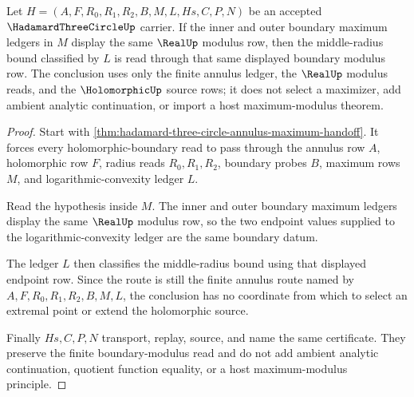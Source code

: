 \begin{theorem}
\label{thm:hadamard-three-circle-maximum-modulus-boundary}
Let $H=(A,F,R_0,R_1,R_2,B,M,L,Hs,C,P,N)$ be an accepted $\HadamardThreeCircleUp$ carrier. If the inner and outer boundary maximum ledgers in $M$ display the same $\RealUp$ modulus row, then the middle-radius bound classified by $L$ is read through that same displayed boundary modulus row. The conclusion uses only the finite annulus ledger, the $\RealUp$ modulus reads, and the $\HolomorphicUp$ source rows; it does not select a maximizer, add ambient analytic continuation, or import a host maximum-modulus theorem.
\end{theorem}
\begin{proof}
Start with \autoref{thm:hadamard-three-circle-annulus-maximum-handoff}. It forces every holomorphic-boundary read to pass through the annulus row $A$, holomorphic row $F$, radius reads $R_0,R_1,R_2$, boundary probes $B$, maximum rows $M$, and logarithmic-convexity ledger $L$.

Read the hypothesis inside $M$. The inner and outer boundary maximum ledgers display the same $\RealUp$ modulus row, so the two endpoint values supplied to the logarithmic-convexity ledger are the same boundary datum.

The ledger $L$ then classifies the middle-radius bound using that displayed endpoint row. Since the route is still the finite annulus route named by $A,F,R_0,R_1,R_2,B,M,L$, the conclusion has no coordinate from which to select an extremal point or extend the holomorphic source.

Finally $Hs,C,P,N$ transport, replay, source, and name the same certificate. They preserve the finite boundary-modulus read and do not add ambient analytic continuation, quotient function equality, or a host maximum-modulus principle.
\end{proof}

